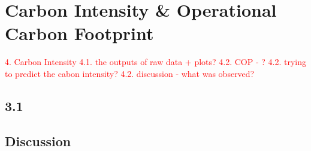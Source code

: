 \section{Carbon Intensity \& Operational Carbon Footprint}
\noindent

\textcolor{red}{4. Carbon Intensity 
4.1. the outputs of raw data + plots?
4.2. COP - ?
4.2. trying to predict the cabon intensity?
4.2. discussion - what was observed?}

\subsection{3.1}

\subsection{Discussion}